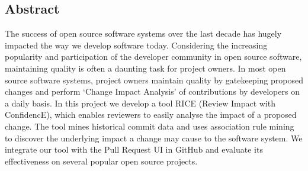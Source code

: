 
\subsection*{Abstract}
The success of open source software systems over the last decade has hugely impacted the way we develop software today. Considering the increasing popularity and participation of the developer community in open source software, maintaining quality is often a daunting task for project owners. In most open source software systems, project owners maintain quality by gatekeeping proposed changes and perform `Change Impact Analysis' of contributions by developers on a daily basis. In this project we develop a tool RICE (Review Impact with ConfidencE), which enables reviewers to easily analyse the impact of a proposed change. The tool mines historical commit data and uses association rule mining to discover the underlying impact a change may cause to the software system. We integrate our tool with the Pull Request UI in GitHub and evaluate its effectiveness on several popular open source projects.

